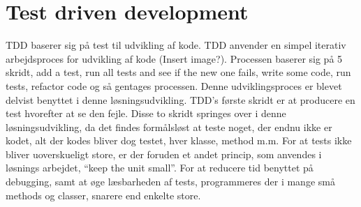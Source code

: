 \section{Test driven development}
TDD baserer sig på test til udvikling af kode. TDD anvender en simpel iterativ arbejdsproces for udvikling af kode (Insert image?). Processen baserer sig på 5 skridt, add a test, run all tests and see if the new one fails, write some code, run tests, refactor code og så gentages processen. Denne udviklingsproces er blevet delvist benyttet i denne løsningsudvikling. TDD's første skridt er at producere en test hvorefter at se den fejle. Disse to skridt springes over i denne løsningsudvikling, da det findes formålsløst at teste noget, der endnu ikke er kodet, alt der kodes bliver dog testet, hver klasse, method m.m. For at tests ikke bliver uoverskueligt store, er der foruden et andet princip, som anvendes i løsnings arbejdet, ``keep the unit small''. For at reducere tid benyttet på debugging, samt at øge læsbarheden af tests, programmeres der i mange små methods og classer, snarere end enkelte store.
